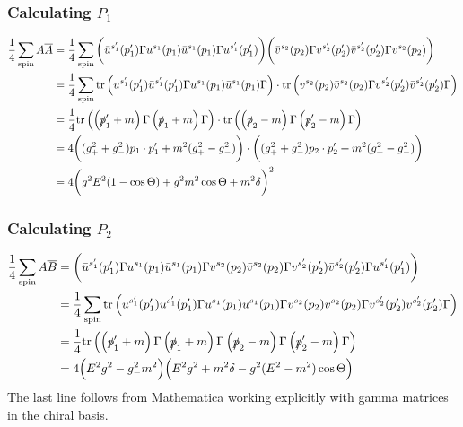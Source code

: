 \documentclass[12pt]{article}
\begin{document}
\subsubsection{Calculating $P_1$}

\begin{align*}
\frac{1}{4} \sum_{\text{spin}} A \overline{A} & = \frac{1}{4} \sum_{\text{spin}} \bigg( \bar{u}^{s_1'}(p_1') \Gamma u^{s_1}(p_1) \bar{u}^{s_1}(p_1) \Gamma u^{s_1'}(p_1')  \bigg) \bigg( \bar{v}^{s_2}(p_2) \Gamma v^{s_2'}(p_2') \bar{v}^{s_2'}(p_2') \Gamma v^{s_2}(p_2) \bigg)
\\
& = \frac{1}{4} \sum_{\text{spin}} \mathrm{tr} \left(  u^{s_1'}(p_1') \bar{u}^{s_1'}(p_1') \Gamma u^{s_1}(p_1) \bar{u}^{s_1}(p_1) \Gamma  \right) \cdot \mathrm{tr} \left(  v^{s_2}(p_2) \bar{v}^{s_2}(p_2) \Gamma v^{s_2'}(p_2') \bar{v}^{s_2'}(p_2') \Gamma  \right)
\\
& = \frac{1}{4} \mathrm{tr} \left(  \left( \slashed{p}_1' + m \right) \Gamma \left( \slashed{p}_1 + m \right) \Gamma  \right) \cdot \mathrm{tr} \left(  \left( \slashed{p}_2 - m \right) \Gamma \left( \slashed{p}'_2 - m \right) \Gamma  \right)
\\
& = 4 \bigg( ( g_{+}^2 + g_{-}^2) p_1 \cdot p_1' + m^2 (g_{+}^2 - g_{-}^2) \bigg) \cdot \bigg( ( g_{+}^2 + g_{-}^2) p_2 \cdot p_2' +  m^2 (g_{+}^2 - g_{-}^2) \bigg)
\\
& = 4 \bigg( g^2 E^2 (1 - \cos{\Theta}) + g^2 m^2 \cos{\Theta} + m^2 \delta \bigg)^2
\end{align*}

\subsubsection{Calculating $P_2$}

\begin{align*}
\frac{1}{4} \sum_{\text{spin}}  A \overline{B} & = 
\bigg( \bar{u}^{s_1'}(p_1') \Gamma u^{s_1}(p_1) \bar{u}^{s_1}(p_1) \Gamma v^{s_2}(p_2) \bar{v}^{s_2}(p_2) \Gamma v^{s_2'}(p_2') \bar{v}^{s_2'}(p_2') \Gamma  u^{s_1'}(p_1')  \bigg)
\\
& = \frac{1}{4} \sum_{\text{spin}} 
\mathrm{tr} \left(  u^{s_1'}(p_1') \bar{u}^{s_1'}(p_1') \Gamma u^{s_1}(p_1) \bar{u}^{s_1}(p_1) \Gamma v^{s_2}(p_2) \bar{v}^{s_2}(p_2) \Gamma v^{s_2'}(p_2') \bar{v}^{s_2'}(p_2') \Gamma   \right)
\\
& = \frac{1}{4}
\mathrm{tr} \left(  \left( \slashed{p}'_1 + m \right) \Gamma \left( \slashed{p}_1 + m \right) \Gamma \left( \slashed{p}_2 - m \right) \Gamma \left( \slashed{p}'_2 - m \right) \Gamma   \right)
\\
& = 4 \Big( E^2 g^2 - g_{-}^2 m^2 \Big) \Big( E^2 g^2 + m^2 \delta - g^2 (E^2 - m^2) \cos{\Theta} \Big)
\end{align*}
The last line follows from Mathematica working explicitly with gamma matrices in the chiral basis.
\end{document}

